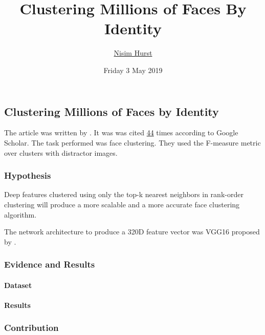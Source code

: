 \documentclass[]{article}
\title{Clustering Millions of Faces By Identity}
\author{\href{mailto:langheran@gmail.com}{Nisim Hurst}}
\date{Friday 3 May 2019}
\let\oldparagraph\paragraph
\renewcommand{\paragraph}[1]{\oldparagraph{#1}\mbox{}}
\begin{document}
\maketitle

\label{toc}

\hypertarget{clustering-millions-of-faces-by-identity}{%
\subsection{Clustering Millions of Faces by Identity}\label{clustering-millions-of-faces-by-identity}}

The article was written by \autocite{otto2018}. It was was cited \href{https://scholar.google.com/scholar?cites=9743611198042490448\&as_sdt=2005\&sciodt=0,5\&hl=en}{44} times according to Google Scholar. The task performed was face clustering. They used the F-measure metric over clusters with distractor images.

\hypertarget{hypothesis}{%
\subsubsection{Hypothesis}\label{hypothesis}}

Deep features clustered using only the top-k nearest neighbors in rank-order clustering will produce a more scalable and a more accurate face clustering algorithm.

The network architecture to produce a 320D feature vector was VGG16 proposed by \autocite{Simonyan2014}.

\hypertarget{evidence-and-results}{%
\subsubsection{Evidence and Results}\label{evidence-and-results}}

\hypertarget{dataset}{%
\paragraph{Dataset}\label{dataset}}

\hypertarget{results}{%
\paragraph{Results}\label{results}}

\hypertarget{contribution}{%
\subsubsection{Contribution}\label{contribution}}
\end{document}
